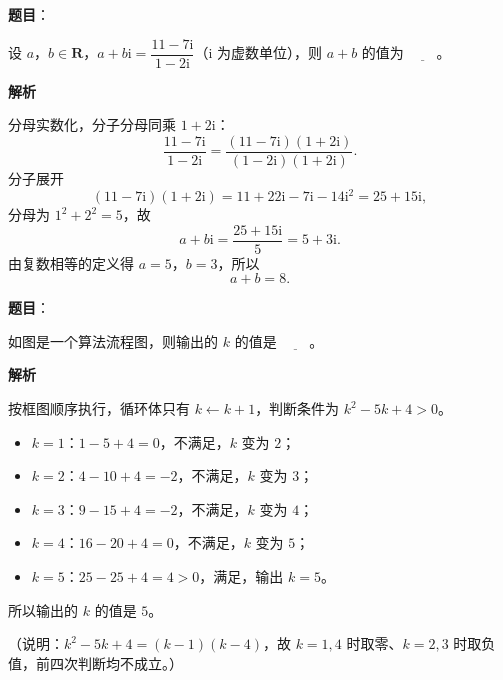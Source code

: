 \begin{answer}

\textbf{题目}：

设 $a$，$b\in\mathbf R$，$a+b\mathrm i=\dfrac{11-7\mathrm i}{1-2\mathrm i}$（$\mathrm i$ 为虚数单位），则 $a+b$ 的值为 $\underline{\qquad}$。

\textbf{解析}

分母实数化，分子分母同乘 $1+2\mathrm i$：
\nopagebreak[4]
\[\frac{11-7\mathrm i}{1-2\mathrm i}=\frac{(11-7\mathrm i)(1+2\mathrm i)}{(1-2\mathrm i)(1+2\mathrm i)}.\]
分子展开
\nopagebreak[4]
\[(11-7\mathrm i)(1+2\mathrm i)=11+22\mathrm i-7\mathrm i-14\mathrm i^2=25+15\mathrm i,\]
分母为 $1^2+2^2=5$，故
\nopagebreak[4]
\[a+b\mathrm i=\frac{25+15\mathrm i}{5}=5+3\mathrm i.\]
由复数相等的定义得 $a=5$，$b=3$，所以
\nopagebreak[4]
\[a+b=8.\]


\end{answer}
\begin{answer}

\textbf{题目}：

如图是一个算法流程图，则输出的 $k$ 的值是 $\underline{\qquad}$。
\nopagebreak[4]
\begin{center}\end{center}
\nopagebreak[4]
\textbf{解析}

按框图顺序执行，循环体只有 $k\leftarrow k+1$，判断条件为 $k^2-5k+4>0$。

\begin{itemize}
\item $k=1$：$1-5+4=0$，不满足，$k$ 变为 $2$；
\item $k=2$：$4-10+4=-2$，不满足，$k$ 变为 $3$；
\item $k=3$：$9-15+4=-2$，不满足，$k$ 变为 $4$；
\item $k=4$：$16-20+4=0$，不满足，$k$ 变为 $5$；
\item $k=5$：$25-25+4=4>0$，满足，输出 $k=5$。
\end{itemize}

所以输出的 $k$ 的值是 $5$。

（说明：$k^2-5k+4=(k-1)(k-4)$，故 $k=1,4$ 时取零、$k=2,3$ 时取负值，前四次判断均不成立。）


\end{answer}
